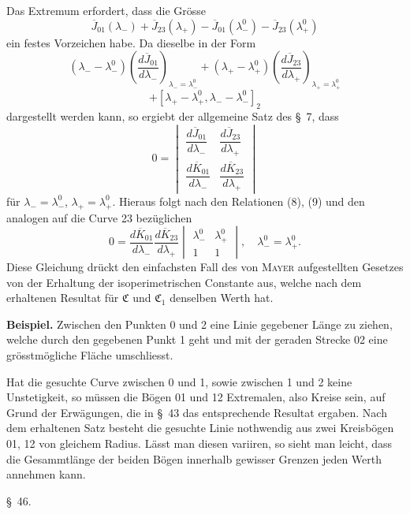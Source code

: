 \documentclass[11pt,a4paper,leqno]{article}
\begin{document}
Das Extremum erfordert, dass die Grösse
\[
\overline{J}_{01}(\lambda_-)+\overline{J}_{23}(\lambda_+)-\overline{J}_{01}(\lambda_-^0)-\overline{J}_{23}(\lambda_+^0)
\]
ein festes Vorzeichen habe. Da dieselbe in der Form
\[
(\lambda_- -\lambda_-^0)\left(\frac{d\overline{J}_{01}}{d\lambda_-}\right)_{\lambda_- =\lambda_-^0}
+(\lambda_+ -\lambda_+^0)\left(\frac{d\overline{J}_{23}}{d\lambda_+}\right)_{\lambda_+ =\lambda_+^0}
\]
\[
+[\lambda_+ -\lambda_+^0,\lambda_- -\lambda_-^0]_2
\]
dargestellt werden kann, so ergiebt der allgemeine Satz des \S~7, dass
\[
0=
\begin{vmatrix}
\dfrac{d\overline{J}_{01}}{d\lambda_-}&\dfrac{d\overline{J}_{23}}{d\lambda_+}\\[1.2ex]
\dfrac{d\overline{K}_{01}}{d\lambda_-}&\dfrac{d\overline{K}_{23}}{d\lambda_+}
\end{vmatrix}
\]
für $\lambda_- =\lambda_-^0$, $\lambda_+ =\lambda_+^0$. Hieraus folgt nach den Relationen (8), (9) und den analogen auf die Curve 23 bezüglichen
\[
0=\frac{d\overline{K}_{01}}{d\lambda_-}\frac{d\overline{K}_{23}}{d\lambda_+}
\begin{vmatrix}
\lambda_-^0&\lambda_+^0\\
1&1
\end{vmatrix},
\quad \lambda_-^0=\lambda_+^0.
\]
Diese Gleichung drückt den einfachsten Fall des von \textsc{Mayer} aufgestellten Gesetzes von der Erhaltung der isoperimetrischen Constante aus, welche nach dem erhaltenen Resultat für $\mathfrak{C}$ und $\mathfrak{C}_1$ denselben Werth hat.

\textbf{Beispiel.} Zwischen den Punkten 0 und 2 eine Linie gegebener Länge zu ziehen, welche durch den gegebenen Punkt 1 geht und mit der geraden Strecke 02 eine grösstmögliche Fläche umschliesst.

Hat die gesuchte Curve zwischen 0 und 1, sowie zwischen 1 und 2 keine Unstetigkeit, so müssen die Bögen 01 und 12 Extremalen, also Kreise sein, auf Grund der Erwägungen, die in \S~43 das entsprechende Resultat ergaben. Nach dem erhaltenen Satz besteht die gesuchte Linie nothwendig aus zwei Kreisbögen 01, 12 von gleichem Radius. Lässt man diesen variiren, so sieht man leicht, dass die Gesammtlänge der beiden Bögen innerhalb gewisser Grenzen jeden Werth annehmen kann.

\begin{center}
{\large \S~46.}
\end{center}
\end{document}

